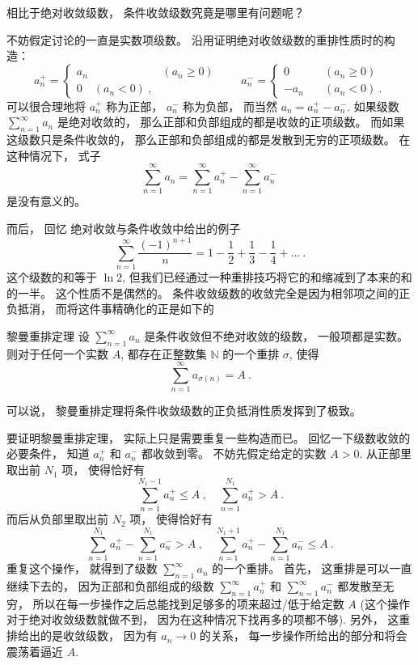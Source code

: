 

相比于绝对收敛级数， 条件收敛级数究竟是哪里有问题呢？ 

不妨假定讨论的一直是实数项级数。 沿用证明绝对收敛级数的重排性质时的构造： 
$$
a_n^+=\left\{\begin{array}{cc}
{a_n}\quad &(a_n\geq0)\\
0\quad (a_n<0)~,
\end{array}\right.
\quad\quad
a_n^-=\left\{\begin{array}{cc}
0\quad &(a_n\geq0)\\
-a_n\quad &(a_n<0)~.
\end{array}\right.
$$
可以很合理地将 $a_n^+$ 称为正部， $a_n^-$ 称为负部， 而当然 $a_n=a_n^+-a_n^-$. 如果级数 $\sum_{n=1}^\infty a_n$ 是绝对收敛的， 那么正部和负部组成的都是收敛的正项级数。 而如果这级数只是条件收敛的， 那么正部和负部组成的都是发散到无穷的正项级数。 在这种情况下， 式子
$$
\sum_{n=1}^\infty a_n=\sum_{n=1}^\infty a_n^+-\sum_{n=1}^\infty a_n^-~
$$
是没有意义的。

而后， 回忆 绝对收敛与条件收敛中给出的例子
$$
\sum_{n=1}^\infty\frac{(-1)^{n+1}}{n}
=1-\frac{1}{2}+\frac{1}{3}-\frac{1}{4}+...~.
$$
这个级数的和等于 $\ln2$, 但我们已经通过一种重排技巧将它的和缩减到了本来的和的一半。 这个性质不是偶然的。 条件收敛级数的收敛完全是因为相邻项之间的正负抵消， 而将这件事精确化的正是如下的

\begin{theorem}{黎曼重排定理}
设 $\sum_{n=1}^\infty a_n$ 是条件收敛但不绝对收敛的级数， 一般项都是实数。 则对于任何一个实数 $A$, 都存在正整数集 $\mathbb{N}$ 的一个重排 $\sigma$, 使得
$$
\sum_{n=1}^\infty a_{\sigma(n)}=A~.
$$
\end{theorem}

可以说， 黎曼重排定理将条件收敛级数的正负抵消性质发挥到了极致。

要证明黎曼重排定理， 实际上只是需要重复一些构造而已。 回忆一下级数收敛的必要条件， 知道 $a_n^+$ 和 $a_n^-$ 都收敛到零。 不妨先假定给定的实数 $A>0$. 从正部里取出前 $N_1$ 项， 使得恰好有
\[
\sum_{n=1}^{N_1-1}a_n^+\leq A~,
\quad
\sum_{n=1}^{N_1}a_n^+> A~.
\]
而后从负部里取出前 $N_2$ 项， 使得恰好有
\[
\sum_{n=1}^{N_1}a_n^+-\sum_{n=1}^{N_1}a_n^-> A~,
\quad
\sum_{n=1}^{N_1+1}a_n^+-\sum_{n=1}^{N_1}a_n^-\leq A~.
\]
重复这个操作， 就得到了级数 $\sum_{n=1}^\infty a_n$ 的一个重排。 首先， 这重排是可以一直继续下去的， 因为正部和负部组成的级数 $\sum_{n=1}^\infty a_n^+$ 和 $\sum_{n=1}^\infty a_n^-$ 都发散至无穷， 所以在每一步操作之后总能找到足够多的项来超过/低于给定数 $A$ (这个操作对于绝对收敛级数就做不到， 因为在这种情况下找再多的项都不够). 另外， 这重排给出的是收敛级数， 因为有 $a_n\to0$ 的关系， 每一步操作所给出的部分和将会震荡着逼近 $A$.

